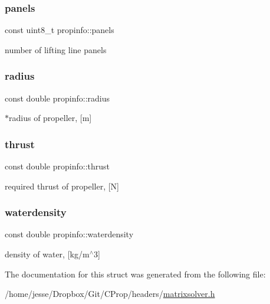 \subsubsection{\texorpdfstring{panels}{panels}}
{\footnotesize\ttfamily const uint8\+\_\+t propinfo\+::panels}

number of lifting line panels \mbox{\label{structpropinfo_ab97e15f8f02761119a39aa355ffd107a}} 
\subsubsection{\texorpdfstring{radius}{radius}}
{\footnotesize\ttfamily const double propinfo\+::radius}

$\ast$radius of propeller, \mbox{[}m\mbox{]} \mbox{\label{structpropinfo_a67edf777e6ffd69c43cb6c0a116b7a96}} 
\subsubsection{\texorpdfstring{thrust}{thrust}}
{\footnotesize\ttfamily const double propinfo\+::thrust}

required thrust of propeller, \mbox{[}N\mbox{]} \mbox{\label{structpropinfo_a33c2f6c5cec21fda9fe54b7b905ca616}} 
\subsubsection{\texorpdfstring{waterdensity}{waterdensity}}
{\footnotesize\ttfamily const double propinfo\+::waterdensity}

density of water, \mbox{[}kg/m$^\wedge$3\mbox{]} 

The documentation for this struct was generated from the following file\+:\begin{DoxyCompactItemize}
\item 
/home/jesse/\+Dropbox/\+Git/\+C\+Prop/headers/\hyperlink{matrixsolver_8h}{matrixsolver.\+h}\end{DoxyCompactItemize}
